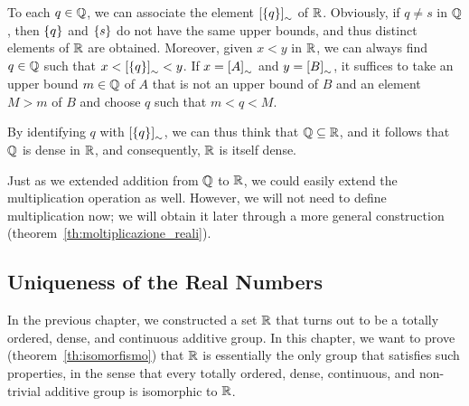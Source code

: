 To each $q\in {\mathbb Q}$, we can associate the element ${\left[ {\left\{ q \right\}} \right]}_\sim$ of
${\mathbb R}$. Obviously, if $q\neq s$ in ${\mathbb Q}$, then ${\left\{ q \right\}}$ and ${\left\{ s \right\}}$ do
not have the same upper bounds, and thus distinct elements of ${\mathbb R}$ are
obtained. Moreover, given $x<y$ in ${\mathbb R}$, we can always find $q\in {\mathbb Q}$ such
that $x < {\left[ {\left\{ q \right\}} \right]}_\sim < y$. If $x={\left[ A \right]}_\sim$ and
$y={\left[ B \right]}_\sim$, it suffices to take an upper bound $m\in {\mathbb Q}$ of $A$ that
is not an upper bound of $B$ and an element $M>m$ of $B$ and choose $q$ such
that $m<q<M$.

By identifying $q$ with ${\left[ {\left\{ q \right\}} \right]}_\sim$, we can thus think that ${\mathbb Q}
\subseteq {\mathbb R}$, and it follows that ${\mathbb Q}$ is dense in ${\mathbb R}$, and consequently,
${\mathbb R}$ is itself dense.

Just as we extended addition from ${\mathbb Q}$ to ${\mathbb R}$, we could easily extend the
multiplication operation as well.
% 
However, we will not need to define multiplication now; we will obtain it later
through a more general construction (theorem~\ref{th:moltiplicazione_reali}).

\subsection{Uniqueness of the Real Numbers}

In the previous chapter, we constructed a set ${\mathbb R}$ that turns out to be a
totally ordered, dense, and continuous additive group. In this chapter, we want
to prove (theorem~\ref{th:isomorfismo}) that ${\mathbb R}$ is essentially the only group
that satisfies such properties, in the sense that every totally ordered, dense,
continuous, and non-trivial additive group is isomorphic to ${\mathbb R}$.


